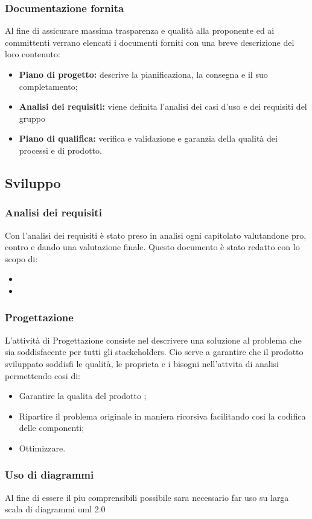 \subsubsection{Documentazione fornita}
Al fine di assicurare massima trasparenza e qualità alla proponente ed ai committenti verrano elencati i documenti forniti con una breve descrizione del loro contenuto:
\begin{itemize}
\item \textbf{Piano di progetto:} descrive la pianificaziona, la consegna e il suo completamento;
\item \textbf{Analisi dei requisiti:} viene definita l'analisi dei casi d'uso e dei requisiti del gruppo
\item \textbf{Piano di qualifica:} verifica e validazione e garanzia della qualità dei processi e di prodotto.
\end{itemize}
 
\subsection{Sviluppo}
\subsubsection{Analisi dei requisiti}
Con l'analisi dei requisiti è stato preso in analisi ogni capitolato valutandone pro, contro e dando una valutazione finale. Questo documento è stato redatto con lo scopo di:
\begin{itemize}
\item 
\item 
\end{itemize}
\subsubsection{Progettazione}
L'attività di Progettazione consiste nel descrivere una soluzione al problema che sia soddisfacente per tutti gli stackeholders. Cio serve a garantire che il prodotto sviluppato soddisfi le qualità, le proprieta e i bisogni nell'attvita di analisi permettendo cosi di:
\begin{itemize}
\item Garantire la qualita del prodotto ;
\item Ripartire il problema originale in maniera ricorsiva facilitando cosi la codifica delle componenti;
\item Ottimizzare.
\end{itemize}	
\subsubsection{Uso di diagrammi}
Al fine di essere il piu comprensibili possibile sara necessario far uso su larga scala di diagrammi uml 2.0



